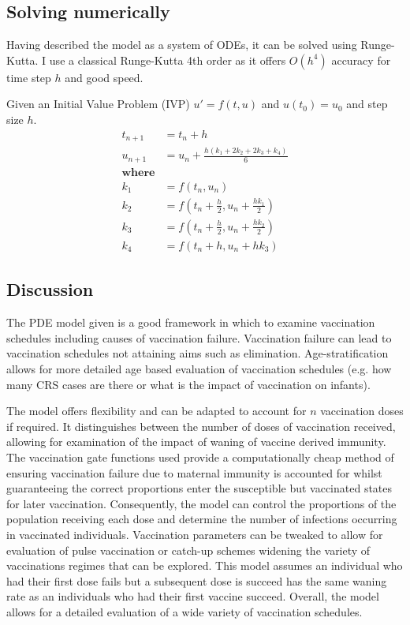 \documentclass[a4paper,11pt] {scrartcl}
\begin{document}
\subsection{Solving numerically}
\label{subsec:buildmodelsolve}
Having described the model as a system of ODEs, it can be solved using Runge-Kutta. I use a classical Runge-Kutta 4th order as it offers $O(h^4)$ accuracy for time step $h$\cite{suli2010NSDEnotes} and good speed.

Given an Initial Value Problem (IVP) $u'=f(t,u)$ and $u(t_0) = u_0$ and step size $h$.
\begin{align*}
t_{n+1} &= t_n+h\\
u_{n+1} &= u_n + \frac{h\left(k_1+2k_2+2k_3+k_4\right)}{6}\\
\textbf{where}\\
k_1 &= f\left(t_n,u_n\right)\\
k_2 &= f\left(t_n+\frac{h}{2},u_n+\frac{hk_1}{2}\right)\\
k_3 &= f\left(t_n+\frac{h}{2},u_n+\frac{hk_2}{2}\right)\\
k_4 &= f\left(t_n+h,u_n+hk_3\right)
\end{align*}

\subsection{Discussion}
\label{subsec:buildmodeldiscussion}
The PDE model given is a good framework in which to examine vaccination schedules including causes of vaccination failure. Vaccination failure can lead to vaccination schedules not attaining aims such as elimination. Age-stratification allows for more detailed age based evaluation of vaccination schedules (e.g. how many CRS cases are there or what is the impact of vaccination on infants).

The model offers flexibility and can be adapted to account for $n$ vaccination doses if required. It distinguishes between the number of doses of vaccination received, allowing for examination of the impact of waning of vaccine derived immunity. The vaccination gate functions used provide a computationally cheap method of ensuring vaccination failure due to maternal immunity is accounted for whilst guaranteeing the correct proportions enter the susceptible but vaccinated states for later vaccination. Consequently, the model can control the proportions of the population receiving each dose and determine the number of infections occurring in vaccinated individuals. Vaccination parameters can be tweaked to allow for evaluation of pulse vaccination or catch-up schemes widening the variety of vaccinations regimes that can be explored. This model assumes an individual who had their first dose fails but a subsequent dose is succeed has the same waning rate as an individuals who had their first vaccine succeed. Overall, the model allows for a detailed evaluation of a wide variety of vaccination schedules.
\end{document}
